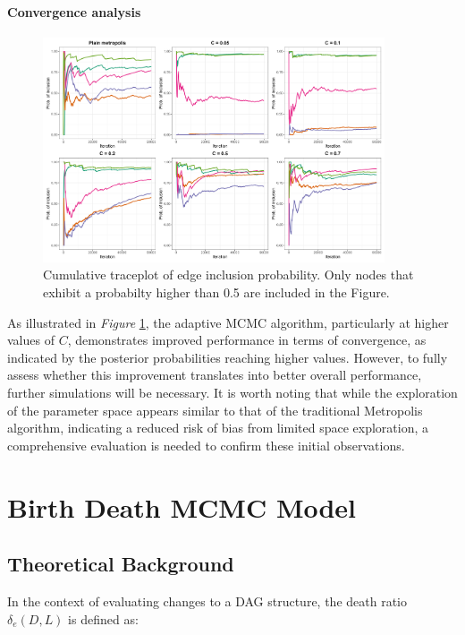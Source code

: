 \documentclass{report}
\begin{document}
\paragraph{Convergence analysis}

\begin{figure}[h] 
	\centering
	\includegraphics[width=0.9\textwidth]{Figures/Adaptive_behaviour/nodes_trace.png}
	\caption{Cumulative traceplot of edge inclusion probability. Only nodes that exhibit a probabilty higher than 0.5 are included in the Figure.}
	\label{fig:c-convergence}
\end{figure}

As illustrated in \textit{Figure} \ref{fig:c-convergence}, the adaptive MCMC algorithm, particularly at higher values of $C$, demonstrates improved performance in terms of convergence, as indicated by the posterior probabilities reaching higher values. However, to fully assess whether this improvement translates into better overall performance, further simulations will be necessary. It is worth noting that while the exploration of the parameter space appears similar to that of the traditional Metropolis algorithm, indicating a reduced risk of bias from limited space exploration, a comprehensive evaluation is needed to confirm these initial observations.

\section{Birth Death MCMC Model}

\subsection{Theoretical Background}

In the context of evaluating changes to a DAG structure, the death ratio $\delta_e(D,L)$ is defined as:
\end{document}
